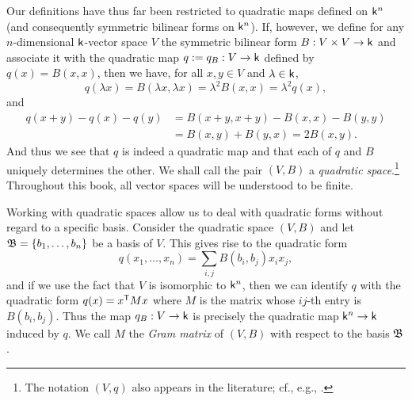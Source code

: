Our definitions have thus far been restricted to quadratic maps defined on
\(\mathsf{k}^n\) (and consequently symmetric bilinear forms on \(\mathsf{k}^n\)). If,
however, we define for any \(n\)-dimensional \(\mathsf{k}\)-vector space \(V\) the
symmetric bilinear form \(B: V \times V \to \mathsf{k}\) and associate it with the
quadratic map \(q:= q_B: V \to \mathsf{k}\) defined by \(q(x) = B(x,x)\), then we
have, for all \(x, y \in V\) and \(\lambda \in \mathsf{k}\),
\[
    q(\lambda x) = B(\lambda x, \lambda x) = \lambda^2 B(x, x) = \lambda^2 q(x),
\]
and
\begin{align*}
    q(x + y ) - q(x) - q(y) &= B(x+y, x+y) - B(x, x) - B(y, y)\\
    &=B(x,y) + B(y,x) = 2B(x,y).
\end{align*}
And thus we see that \(q\) is indeed a quadratic map and that each of \(q\) and
\(B\) uniquely determines the other. We shall call the pair \((V, B)\) a
\emph{quadratic space}.\footnote{The notation \((V, q)\) also appears in the
literature; cf., e.g., \cite[p.~4]{lam1973quadratic}.} Throughout this book, all
vector spaces will be understood to be finite.

Working with quadratic spaces allow us to deal with quadratic forms without
regard to a specific basis. Consider the quadratic space \((V, B)\) and let
\(\mathfrak{B} = \{b_1, \dots, b_n\}\) be a basis of \(V\). This gives rise to the
quadratic form
\[
  q(x_1, \dots, x_n) = \sum_{i, j} B(b_i, b_j) x_i x_j,  
\]
and if we use the fact that \(V\) is isomorphic to \(\mathsf{k}^n\), then we can
identify \(q\) with the quadratic form \(q(x) = x^{\mathsf{T}}Mx\) where \(M\) is
the matrix whose \(ij\)-th entry is \(B(b_i, b_j)\). Thus the map \(q_B : V \to
\mathsf{k}\) is precisely the quadratic map \(\mathsf{k}^n \to \mathsf{k}\) induced by
\(q\). We call \(M\) the \emph{Gram matrix} of \((V, B)\) with respect to the
basis \(\mathfrak{B}\).\label{sec:quadratic-forms-basis}

